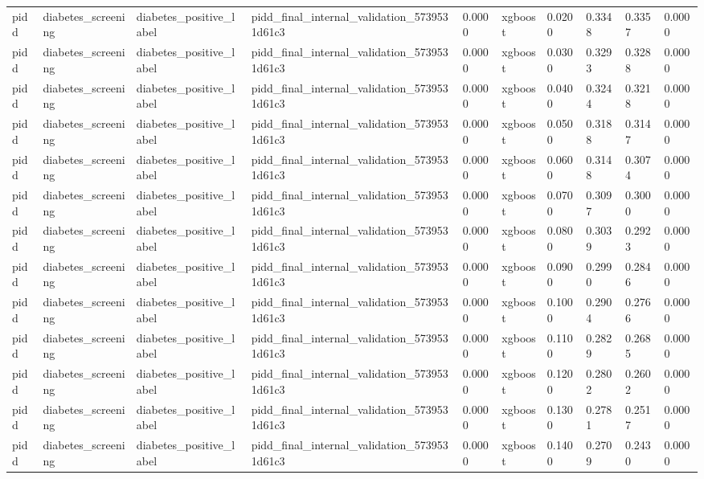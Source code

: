 \begin{tabular}{llllllllll}
pidd & diabetes\_screening & diabetes\_positive\_label & pidd\_final\_internal\_validation\_5739531d61c3 & 0.0000 & xgboost & 0.0200 & 0.3348 & 0.3357 & 0.0000 \\
pidd & diabetes\_screening & diabetes\_positive\_label & pidd\_final\_internal\_validation\_5739531d61c3 & 0.0000 & xgboost & 0.0300 & 0.3293 & 0.3288 & 0.0000 \\
pidd & diabetes\_screening & diabetes\_positive\_label & pidd\_final\_internal\_validation\_5739531d61c3 & 0.0000 & xgboost & 0.0400 & 0.3244 & 0.3218 & 0.0000 \\
pidd & diabetes\_screening & diabetes\_positive\_label & pidd\_final\_internal\_validation\_5739531d61c3 & 0.0000 & xgboost & 0.0500 & 0.3188 & 0.3147 & 0.0000 \\
pidd & diabetes\_screening & diabetes\_positive\_label & pidd\_final\_internal\_validation\_5739531d61c3 & 0.0000 & xgboost & 0.0600 & 0.3148 & 0.3074 & 0.0000 \\
pidd & diabetes\_screening & diabetes\_positive\_label & pidd\_final\_internal\_validation\_5739531d61c3 & 0.0000 & xgboost & 0.0700 & 0.3097 & 0.3000 & 0.0000 \\
pidd & diabetes\_screening & diabetes\_positive\_label & pidd\_final\_internal\_validation\_5739531d61c3 & 0.0000 & xgboost & 0.0800 & 0.3039 & 0.2923 & 0.0000 \\
pidd & diabetes\_screening & diabetes\_positive\_label & pidd\_final\_internal\_validation\_5739531d61c3 & 0.0000 & xgboost & 0.0900 & 0.2990 & 0.2846 & 0.0000 \\
pidd & diabetes\_screening & diabetes\_positive\_label & pidd\_final\_internal\_validation\_5739531d61c3 & 0.0000 & xgboost & 0.1000 & 0.2904 & 0.2766 & 0.0000 \\
pidd & diabetes\_screening & diabetes\_positive\_label & pidd\_final\_internal\_validation\_5739531d61c3 & 0.0000 & xgboost & 0.1100 & 0.2829 & 0.2685 & 0.0000 \\
pidd & diabetes\_screening & diabetes\_positive\_label & pidd\_final\_internal\_validation\_5739531d61c3 & 0.0000 & xgboost & 0.1200 & 0.2802 & 0.2602 & 0.0000 \\
pidd & diabetes\_screening & diabetes\_positive\_label & pidd\_final\_internal\_validation\_5739531d61c3 & 0.0000 & xgboost & 0.1300 & 0.2781 & 0.2517 & 0.0000 \\
pidd & diabetes\_screening & diabetes\_positive\_label & pidd\_final\_internal\_validation\_5739531d61c3 & 0.0000 & xgboost & 0.1400 & 0.2709 & 0.2430 & 0.0000 \\

\end{tabular}
